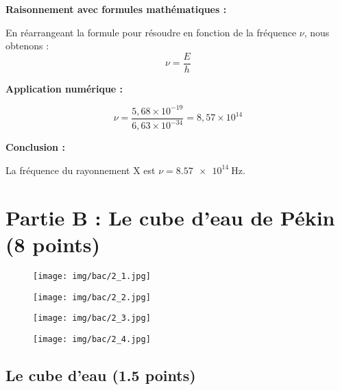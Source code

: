 \documentclass[answers]{exam}
\begin{document}
\begin{solution}
\textbf{Raisonnement avec formules mathématiques :}

En réarrangeant la formule pour résoudre en fonction de la fréquence \(\nu\), nous obtenons :
\[
\nu = \frac{E}{h}
\]

\textbf{Application numérique :}

\[
\nu = \frac{5,68 \times 10^{-19}}{6,63 \times 10^{-34}} = 8,57 \times 10^{14}
\]

\textbf{Conclusion :}

La fréquence du rayonnement X est \(\nu = \SI{8,57e14}{\hertz}\).

\end{solution}

\section*{Partie B : Le cube d'eau de Pékin (8 points)}

\begin{figure}[H]
  \centering
  \texttt{[image: img/bac/2\_1.jpg]}
\end{figure}

\begin{figure}[H]
  \centering
  \texttt{[image: img/bac/2\_2.jpg]}
\end{figure}

\begin{figure}[H]
  \centering
  \texttt{[image: img/bac/2\_3.jpg]}
\end{figure}

\begin{figure}[H]
  \centering
  \texttt{[image: img/bac/2\_4.jpg]}
\end{figure}

\subsection*{Le cube d'eau (1.5 points)}
\end{document}
